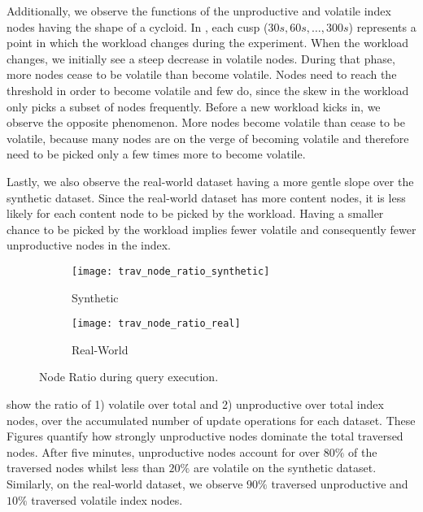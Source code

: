 \documentclass[abstracton,12pt]{scrartcl}
\theoremstyle{definition}
\begin{document}

Additionally, we observe the functions of the unproductive and volatile index
nodes having the shape of a cycloid. In , each
cusp \cite{cusp} ($30 s, 60 s, \dots, 300 s$) represents a point in which the workload
changes during the experiment. When the workload changes, we initially see a
steep decrease in volatile nodes. During that phase, more nodes cease to be
volatile than become volatile. Nodes need to reach the threshold in order to
become volatile and few do, since the skew in the workload only picks a subset of
nodes frequently. Before a new workload kicks in, we observe the opposite
phenomenon. More nodes become volatile than cease to be volatile, because many nodes are
on the verge of becoming volatile and therefore need to be picked only a few
times more to become volatile. 

Lastly, we also observe the real-world dataset having a more gentle slope over
the synthetic dataset. Since
the real-world dataset has more content nodes, it is less likely for each
content node to be picked by the workload. Having a smaller chance to be
picked by the workload implies fewer volatile and consequently fewer
unproductive nodes in the index.  

\begin{figure}[ht]
  \centering
  \begin{subfigure}{0.49\linewidth}
    \centering
    \caption{Synthetic}
    \texttt{[image: trav\_node\_ratio\_synthetic]}
    \label{fig:trav_node_ratio_synthetic}
  \end{subfigure}
  \begin{subfigure}{0.49\linewidth}
    \centering
    \caption{Real-World}
    \texttt{[image: trav\_node\_ratio\_real]}
    \label{fig:trav_node_ratio_real}
  \end{subfigure}
  \vspace{-0.5cm}
  \caption[Node Ratio during query execution]{Node Ratio during query execution.}
  \label{fig:trav_node_ratio}
\end{figure}

show the ratio of 1) volatile over total and 2) unproductive over total index nodes,
over the accumulated number of update operations for each dataset. 
These Figures quantify how
strongly unproductive nodes dominate the total traversed nodes. After five minutes,
unproductive nodes account for over $80\%$ of the traversed nodes whilst
less than $20\%$ are volatile on the synthetic dataset.
Similarly, on the real-world dataset, we observe $90\%$ traversed unproductive and $10\%$
traversed volatile index nodes.
\end{document}
